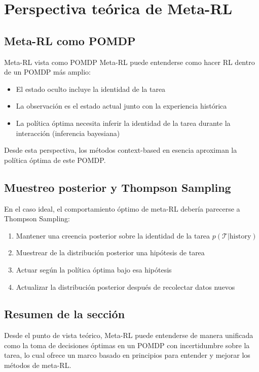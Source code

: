 \section{Perspectiva teórica de Meta-RL}

\subsection{Meta-RL como POMDP}

\begin{importantbox}{Meta-RL vista como POMDP}
Meta-RL puede entenderse como hacer RL dentro de un POMDP más amplio:
\begin{itemize}
    \item El estado oculto incluye la identidad de la tarea
    \item La observación es el estado actual junto con la experiencia histórica
    \item La política óptima necesita inferir la identidad de la tarea durante la interacción (inferencia bayesiana)
\end{itemize}
Desde esta perspectiva, los métodos context-based en esencia aproximan la política óptima de este POMDP.
\end{importantbox}

\subsection{Muestreo posterior y Thompson Sampling}

En el caso ideal, el comportamiento óptimo de meta-RL debería parecerse a Thompson Sampling:
\begin{enumerate}
    \item Mantener una creencia posterior sobre la identidad de la tarea $p(\mathcal{T} | \text{history})$
    \item Muestrear de la distribución posterior una hipótesis de tarea
    \item Actuar según la política óptima bajo esa hipótesis
    \item Actualizar la distribución posterior después de recolectar datos nuevos
\end{enumerate}

\subsection{Resumen de la sección}

Desde el punto de vista teórico, Meta-RL puede entenderse de manera unificada como la toma de decisiones óptimas en un POMDP con incertidumbre sobre la tarea, lo cual ofrece un marco basado en principios para entender y mejorar los métodos de meta-RL.

